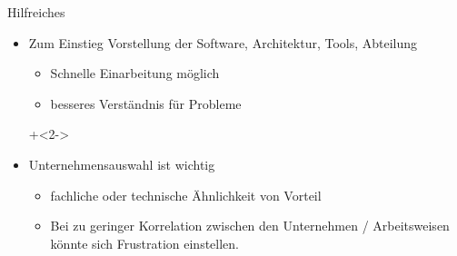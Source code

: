  
\begin{frame}{Hilfreiches}
 
\begin{itemize}
 
\item Zum Einstieg Vorstellung der Software, Architektur, Tools, Abteilung
\begin{itemize}
\item Schnelle Einarbeitung möglich
\item besseres Verständnis für Probleme
\end{itemize}
 
\onslide+<2->
\item Unternehmensauswahl ist wichtig
\begin{itemize}
\item fachliche oder technische Ähnlichkeit von Vorteil
\item Bei zu geringer Korrelation zwischen den Unternehmen / Arbeitsweisen könnte sich Frustration einstellen.
\end{itemize}
 
\end{itemize}
 
\end{frame}
 
